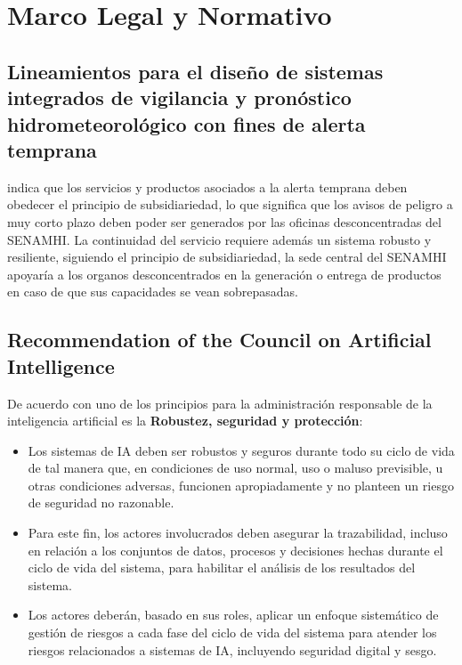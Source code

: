 \section{Marco Legal y Normativo}

\subsection{Lineamientos para el diseño de sistemas integrados de vigilancia y 
pronóstico hidrometeorológico con fines de alerta temprana}

\cite{senamhi2021lineamientos} indica que los servicios y productos asociados a 
la alerta temprana deben obedecer el principio de subsidiariedad, lo que 
significa que los avisos de peligro a muy corto plazo deben poder ser generados 
por las oficinas desconcentradas del SENAMHI.\newline
La continuidad del servicio requiere además un sistema robusto y resiliente, 
siguiendo el principio de subsidiariedad, la sede central del SENAMHI apoyaría 
a los organos desconcentrados en la generación o entrega de productos en caso 
de que sus capacidades se vean sobrepasadas.

\subsection{Recommendation of the Council on Artificial Intelligence}

De acuerdo con \cite{oecd2019recom} uno de los principios para la 
administración responsable de la inteligencia artificial es la 
\textbf{Robustez, seguridad y protección}:
\begin{itemize}
  \item Los sistemas de IA deben ser robustos y seguros durante todo su ciclo de 
  vida de tal manera que, en condiciones de uso normal, uso o maluso previsible, 
  u otras condiciones adversas, funcionen apropiadamente y no planteen un riesgo 
  de seguridad no razonable.
  \item Para este fin, los actores involucrados deben asegurar la trazabilidad, 
  incluso en relación a los conjuntos de datos, procesos y decisiones hechas 
  durante el ciclo de vida del sistema, para habilitar el análisis de los 
  resultados del sistema.
  \item Los actores deberán, basado en sus roles, aplicar un enfoque sistemático 
  de gestión de riesgos a cada fase del ciclo de vida del sistema para atender 
  los riesgos relacionados a sistemas de IA, incluyendo seguridad digital y 
  sesgo.
\end{itemize}


